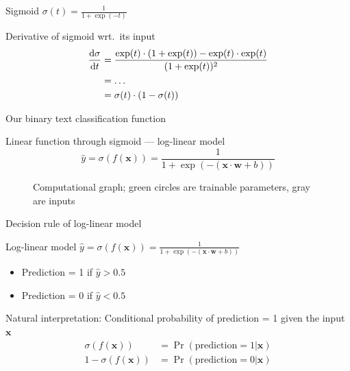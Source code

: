 \documentclass[12pt,aspectratio=169,handout]{beamer}
\begin{document}
\begin{frame}{Sigmoid $\sigma(t) = \frac{1}{1 + \exp(-t)}$}

\begin{block}{Derivative of sigmoid wrt.\ its input}
$$
\begin{aligned}
\dv{\sigma}{t}
&=\frac {\exp(t) \cdot (1+\exp(t)) - \exp(t) \cdot \exp(t)}{(1+\exp(t))^{2}} \\
&= \ldots \\
&= \sigma(t) \cdot \left( 1- \sigma(t) \right)
\end{aligned}
$$	
\end{block}



\end{frame}

\begin{frame}{Our binary text classification function}

Linear function through sigmoid --- log-linear model
$$
\hat{y} = \sigma(f(\bm{x})) = \frac{1}{1 + \exp(- (\bm{x} \cdot \bm{w} + b))}
$$	

\begin{figure}
\caption{Computational graph; green circles are trainable parameters, gray are inputs}
\end{figure}
	
\end{frame}

\begin{frame}{Decision rule of log-linear model}
	
Log-linear model
$
\hat{y} = \sigma(f(\bm{x})) = \frac{1}{1 + \exp(- (\bm{x} \cdot \bm{w} + b))}
$	

\begin{itemize}
	\item Prediction = 1 if $\hat{y} > 0.5$	
	\item Prediction = 0 if $\hat{y} < 0.5$
\end{itemize}

\bigskip

Natural interpretation: Conditional probability of prediction = 1 given the input $\bm{x}$
$$
\begin{aligned}
\sigma(f(\bm{x})) &= \Pr(\text{prediction} = 1 | \bm{x}) \\
1 - \sigma(f(\bm{x})) &= \Pr(\text{prediction} = 0 | \bm{x})
\end{aligned}
$$

\end{frame}
\end{document}
